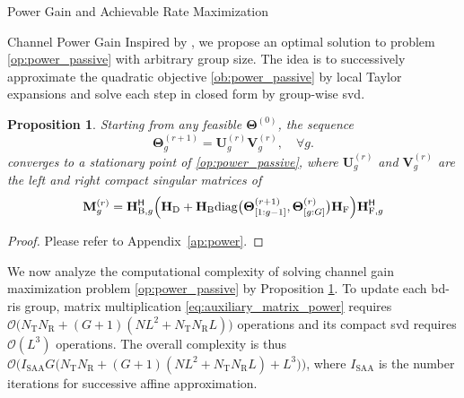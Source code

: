 \documentclass[journal]{IEEEtran}
\newtheorem{proposition}{Proposition}
\begin{document}
\begin{section}{Power Gain and Achievable Rate Maximization}
\begin{subsection}{Channel Power Gain}
		Inspired by \cite{Nie2017}, we propose an optimal solution to problem \eqref{op:power_passive} with arbitrary group size.
		The idea is to successively approximate the quadratic objective \eqref{ob:power_passive} by local Taylor expansions and solve each step in closed form by group-wise \gls{svd}.

		\begin{proposition}\label{pp:power}
			Starting from any feasible $\mathbf{\Theta}^{(0)}$, the sequence
			\begin{equation}
				\mathbf{\Theta}_g^{(r+1)} = \mathbf{U}_g^{(r)} \mathbf{V}_g^{(r)}, \quad \forall g.
				\label{eq:scattering_power}
			\end{equation}
			converges to a stationary point of \eqref{op:power_passive}, where $\mathbf{U}_g^{(r)}$ and $\mathbf{V}_g^{(r)}$ are the left and right compact singular matrices of
			\begin{equation}
				\mathbf{M}_g^{(r)} = \mathbf{H}_{\mathrm{B},g}^\mathsf{H} \Bigl(\mathbf{H}_\mathrm{D} + \mathbf{H}_\mathrm{B} \mathrm{diag}\bigl(\mathbf{\Theta}_{[1:g-1]}^{(r+1)},\mathbf{\Theta}_{[g:G]}^{(r)}\bigr) \mathbf{H}_\mathrm{F}\Bigr) \mathbf{H}_{\mathrm{F},g}^\mathsf{H}
				\label{eq:auxiliary_matrix_power}
			\end{equation}
		\end{proposition}

		\begin{proof}
			Please refer to Appendix~\ref{ap:power}.
		\end{proof}

		We now analyze the computational complexity of solving channel gain maximization problem \eqref{op:power_passive} by Proposition \ref{pp:power}.
		To update each \gls{bd}-\gls{ris} group, matrix multiplication \eqref{eq:auxiliary_matrix_power} requires $\mathcal{O}\bigl(N_\mathrm{T} N_\mathrm{R} + (G+1)(NL^2+N_\mathrm{T} N_\mathrm{R} L)\bigr)$ operations and its compact \gls{svd} requires $\mathcal{O}(L^3)$ operations.
		The overall complexity is thus $\mathcal{O}\bigl(I_\text{SAA} G \bigl(N_\mathrm{T} N_\mathrm{R} + (G+1)(NL^2+N_\mathrm{T} N_\mathrm{R} L) + L^3\bigr)\bigr)$, where $I_\text{SAA}$ is the number iterations for successive affine approximation.
	\end{subsection}


\end{section}
\end{document}
